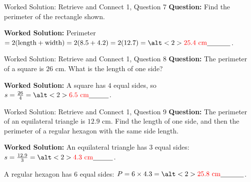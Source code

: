 \documentclass{beamer}
\newcommand{\ablank}[1]{%
  \alt<2>{\textcolor{red}{#1}}{\underline{\phantom{#1}}}%
}
\begin{document}
\begin{frame}{Worked Solution: Retrieve and Connect 1, Question 7}
\small
\textbf{Question:} Find the perimeter of the rectangle shown.

\begin{center}
\end{center}

\textbf{Worked Solution:} Perimeter \(=2(\text{length}+\text{width})=2(8.5+4.2)=2(12.7)=\ablank{25.4\text{ cm}}\).
\end{frame}

\begin{frame}{Worked Solution: Retrieve and Connect 1, Question 8}
\small
\textbf{Question:} The perimeter of a square is \(26\) cm. What is the length of one side?

\textbf{Worked Solution:} A square has \(4\) equal sides, so
\(s=\frac{26}{4}=\ablank{6.5\text{ cm}}\).
\end{frame}

\begin{frame}{Worked Solution: Retrieve and Connect 1, Question 9}
\small
\textbf{Question:} The perimeter of an equilateral triangle is \(12.9\) cm. Find the length of one side, and then the perimeter of a regular hexagon with the same side length.

\textbf{Worked Solution:} An equilateral triangle has \(3\) equal sides:
\(s=\frac{12.9}{3}=\ablank{4.3\text{ cm}}\).

A regular hexagon has \(6\) equal sides:
\(P=6\times4.3=\ablank{25.8\text{ cm}}\).
\end{frame}
\end{document}
